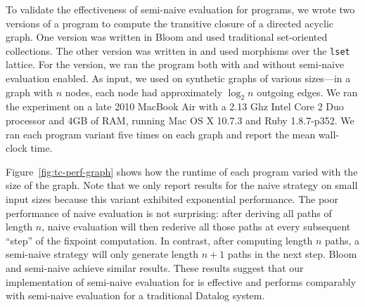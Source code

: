 To validate the effectiveness of semi-naive evaluation for \lang programs, we
wrote two versions of a program to compute the transitive closure of a directed
acyclic graph. One version was written in Bloom and used traditional
set-oriented collections. The other version was written in \lang and used
morphisms over the \texttt{lset} lattice. For the \lang version, we ran the
program both with and without semi-naive evaluation enabled. As input, we used
on synthetic graphs of various sizes---in a graph with $n$ nodes, each node had
approximately $\log_2 n$ outgoing edges. We ran the experiment on a late 2010
MacBook Air with a 2.13 Ghz Intel Core 2 Duo processor and 4GB of RAM, running
Mac OS X 10.7.3 and Ruby 1.8.7-p352. We ran each program variant five times on
each graph and report the mean wall-clock time.

Figure~\ref{fig:tc-perf-graph} shows how the runtime of each program varied with
the size of the graph. Note that we only report results for the naive \lang
strategy on small input sizes because this variant exhibited exponential
performance. The poor performance of naive evaluation is not surprising: after
deriving all paths of length $n$, naive evaluation will then rederive all those
paths at every subsequent ``step'' of the fixpoint computation. In contrast,
after computing length $n$ paths, a semi-naive strategy will only generate
length $n+1$ paths in the next step. Bloom and semi-naive \lang achieve similar
results. These results suggest that our implementation of semi-naive evaluation
for \lang is effective and performs comparably with semi-naive evaluation for a
traditional Datalog system.
